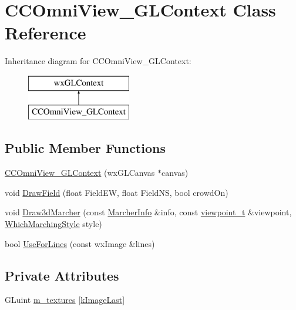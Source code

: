 \hypertarget{a00050}{\section{C\-C\-Omni\-View\-\_\-\-G\-L\-Context Class Reference}
\label{a00050}
}
Inheritance diagram for C\-C\-Omni\-View\-\_\-\-G\-L\-Context\-:\begin{figure}[H]
\begin{center}
\leavevmode
\includegraphics[height=2.000000cm]{a00050}
\end{center}
\end{figure}
\subsection*{Public Member Functions}
\begin{DoxyCompactItemize}
\item 
\hyperlink{a00050_ac66f48acb1583ae25a6ed770c746ba6a}{C\-C\-Omni\-View\-\_\-\-G\-L\-Context} (wx\-G\-L\-Canvas $\ast$canvas)
\item 
void \hyperlink{a00050_aca426c616d0fb783feafe7de5870e124}{Draw\-Field} (float Field\-E\-W, float Field\-N\-S, bool crowd\-On)
\item 
void \hyperlink{a00050_aae01a0d26f053eccd0688f6842708f49}{Draw3d\-Marcher} (const \hyperlink{a00110}{Marcher\-Info} \&info, const \hyperlink{a00154}{viewpoint\-\_\-t} \&viewpoint, \hyperlink{a00184_aaa2f3b8c2e888a44317f26cff6f9bf7d}{Which\-Marching\-Style} style)
\item 
bool \hyperlink{a00050_af821fc86e6add66e885b5d8150017d03}{Use\-For\-Lines} (const wx\-Image \&lines)
\end{DoxyCompactItemize}
\subsection*{Private Attributes}
\begin{DoxyCompactItemize}
\item 
G\-Luint \hyperlink{a00050_a00cadfd974ac7c904eba18fded443089}{m\-\_\-textures} \mbox{[}\hyperlink{a00184_a7eb3720b4254c41f480c577182480c7baddebdce3e8697071b6d1b87d0a0794fb}{k\-Image\-Last}\mbox{]}
\end{DoxyCompactItemize}


